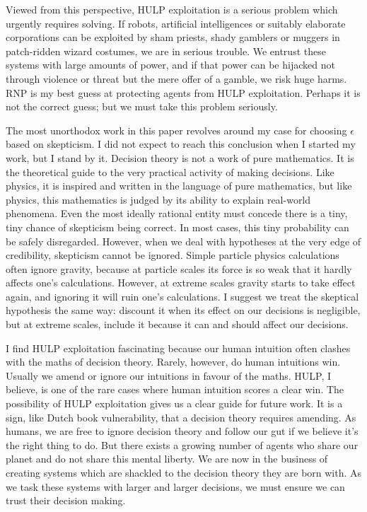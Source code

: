 \documentclass{article}
\begin{document}
Viewed from this perspective, HULP exploitation is a serious problem which urgently requires solving. If robots, artificial intelligences or suitably elaborate corporations can be exploited by sham priests, shady gamblers or muggers in patch-ridden wizard costumes, we are in serious trouble. We entrust these systems with large amounts of power, and if that power can be hijacked not through violence or threat but the mere offer of a gamble, we risk huge harms. RNP is my best guess at protecting agents from HULP exploitation. Perhaps it is not the correct guess; but we must take this problem seriously.

The most unorthodox work in this paper revolves around my case for choosing \(\epsilon\) based on skepticism. I did not expect to reach this conclusion when I started my work, but I stand by it. Decision theory is not a work of pure mathematics. It is the theoretical guide to the very practical activity of making decisions. Like physics, it is inspired and written in the language of pure mathematics, but like physics, this mathematics is judged by its ability to explain real-world phenomena. Even the most ideally rational entity must concede there is a tiny, tiny chance of skepticism being correct. In most cases, this tiny probability can be safely disregarded. However, when we deal with hypotheses at the very edge of credibility, skepticism cannot be ignored. Simple particle physics calculations often ignore gravity, because at particle scales its force is so weak that it hardly affects one's calculations. However, at extreme scales gravity starts to take effect again, and ignoring it will ruin one's calculations. I suggest we treat the skeptical hypothesis the same way: discount it when its effect on our decisions is negligible, but at extreme scales, include it because it can and should affect our decisions.

I find HULP exploitation fascinating because our human intuition often clashes with the maths of decision theory. Rarely, however, do human intuitions win. Usually we amend or ignore our intuitions in favour of the maths. HULP, I believe, is one of the rare cases where human intuition scores a clear win. The possibility of HULP exploitation gives us a clear guide for future work. It is a sign, like Dutch book vulnerability, that a decision theory requires amending. As humans, we are free to ignore decision theory and follow our gut if we believe it's the right thing to do. But there exists a growing number of agents who share our planet and do not share this mental liberty. We are now in the business of creating systems which are shackled to the decision theory they are born with. As we task these systems with larger and larger decisions, we must ensure we can trust their decision making.





\end{document}
